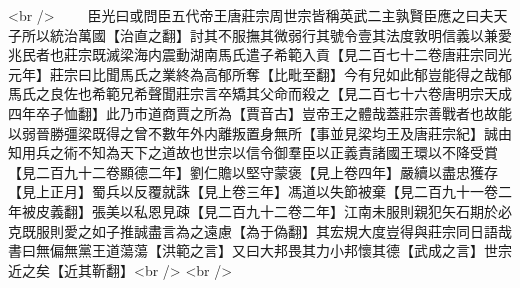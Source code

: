 <br />
　　臣光曰或問臣五代帝王唐莊宗周世宗皆稱英武二主孰賢臣應之曰夫天子所以統治萬國【治直之翻】討其不服撫其微弱行其號令壹其法度敦明信義以兼愛兆民者也莊宗既滅梁海内震動湖南馬氏遣子希範入貢【見二百七十二卷唐莊宗同光元年】莊宗曰比聞馬氏之業終為高郁所奪【比毗至翻】今有兒如此郁豈能得之哉郁馬氏之良佐也希範兄希聲聞莊宗言卒矯其父命而殺之【見二百七十六卷唐明宗天成四年卒子恤翻】此乃市道商賈之所為【賈音古】豈帝王之體哉蓋莊宗善戰者也故能以弱晉勝彊梁既得之曾不數年外内離叛置身無所【事並見梁均王及唐莊宗紀】誠由知用兵之術不知為天下之道故也世宗以信令御羣臣以正義責諸國王環以不降受賞【見二百九十二卷顯德二年】劉仁贍以堅守蒙褒【見上卷四年】嚴續以盡忠獲存【見上正月】蜀兵以反覆就誅【見上卷三年】馮道以失節被棄【見二百九十一卷二年被皮義翻】張美以私恩見疎【見二百九十二卷二年】江南未服則親犯矢石期於必克既服則愛之如子推誠盡言為之遠慮【為于偽翻】其宏規大度豈得與莊宗同日語哉書曰無偏無黨王道蕩蕩【洪範之言】又曰大邦畏其力小邦懷其德【武成之言】世宗近之矣【近其靳翻】<br />
<br />
